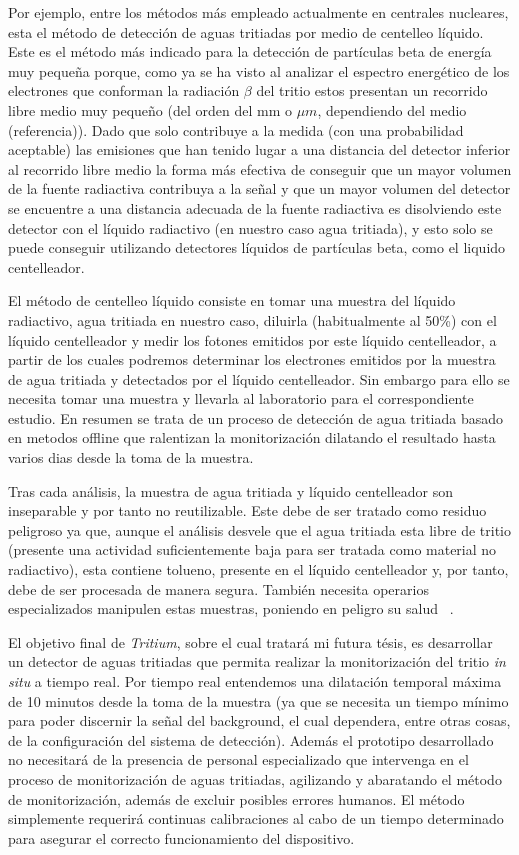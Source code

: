 
Por ejemplo, entre los métodos más empleado actualmente en centrales nucleares, esta el método de detección de aguas tritiadas por medio de centelleo líquido. Este es el método más indicado para la detección de partículas beta de energía muy pequeña porque, como ya se ha visto al analizar el espectro energético de los electrones que conforman la radiación $\beta$ del tritio estos presentan un recorrido libre medio muy pequeño (del orden del mm o $\mu m$, dependiendo del medio (referencia)). Dado que solo contribuye a la medida (con una probabilidad aceptable) las emisiones que han tenido lugar a una distancia del detector inferior al recorrido libre medio la forma más efectiva de conseguir que un mayor volumen de la fuente radiactiva contribuya a la señal y que un mayor volumen del detector se encuentre a una distancia adecuada de la fuente radiactiva es disolviendo este detector con el líquido radiactivo (en nuestro caso agua tritiada), y esto solo se puede conseguir utilizando detectores líquidos de partículas beta, como el liquido centelleador. 

El método de centelleo líquido consiste en tomar una muestra del líquido radiactivo, agua tritiada en nuestro caso, diluirla (habitualmente al 50\%) con el líquido centelleador y medir los fotones emitidos por este líquido centelleador, a partir de los cuales podremos determinar los electrones emitidos por la muestra de agua tritiada y detectados por el líquido centelleador. Sin embargo para ello se necesita tomar una muestra y llevarla al laboratorio para el correspondiente estudio. En resumen se trata de un proceso de detección de agua tritiada basado en metodos offline que ralentizan la monitorización dilatando el resultado hasta varios dias desde la toma de la muestra. 

Tras cada análisis, la muestra de agua tritiada y líquido centelleador son inseparable y por tanto no reutilizable.  Este debe de ser tratado como residuo peligroso ya que, aunque el análisis desvele que el agua tritiada esta libre de tritio (presente una actividad suficientemente baja para ser tratada como material no radiactivo), esta contiene tolueno, presente en el líquido centelleador y, por tanto, debe de ser procesada de manera segura. También necesita operarios especializados manipulen estas muestras, poniendo en peligro su salud ~\cite{gel}.

El objetivo final de \textit{Tritium}, sobre el cual tratará mi futura tésis, es desarrollar un detector de aguas tritiadas que permita realizar la monitorización del tritio \textit{in situ} a tiempo real. Por tiempo real entendemos una dilatación temporal máxima de 10 minutos desde la toma de la muestra (ya que se necesita un tiempo mínimo para poder discernir la señal del background, el cual dependera, entre otras cosas, de la configuración del sistema de detección). Además el prototipo desarrollado no necesitará de la presencia de personal especializado que intervenga en el proceso de monitorización de aguas tritiadas, agilizando y abaratando el método de monitorización, además de excluir posibles errores humanos. El método simplemente requerirá continuas calibraciones al cabo de un tiempo determinado para asegurar el correcto funcionamiento del dispositivo. 

